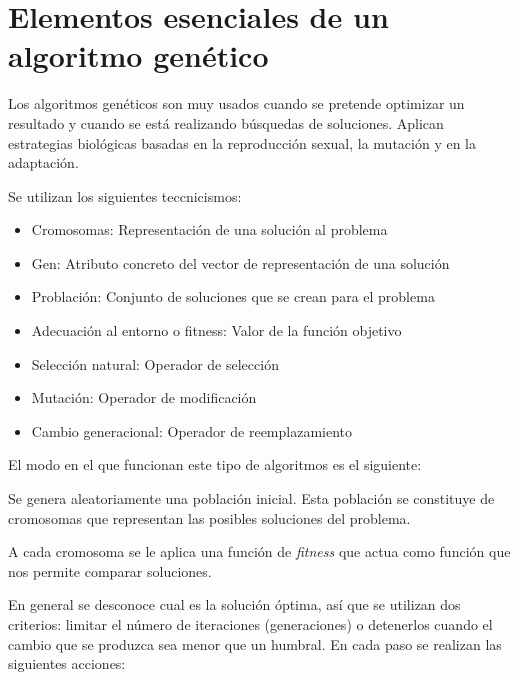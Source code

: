 \documentclass[12pt]{article}
\begin{document}
\section{Elementos esenciales de un algoritmo genético}

Los algoritmos genéticos son muy usados cuando se pretende optimizar
un resultado y cuando se está realizando búsquedas de
soluciones. Aplican estrategias biológicas basadas en la reproducción
sexual, la mutación y en la adaptación.

Se utilizan los siguientes teccnicismos:

\begin{itemize}
\item Cromosomas: Representación de una solución al problema
\item Gen: Atributo concreto del vector de representación de una solución
\item Problación: Conjunto de soluciones que se crean para el problema
\item Adecuación al entorno o fitness: Valor de la función objetivo
\item Selección natural: Operador de selección
\item Mutación: Operador de modificación
\item Cambio generacional: Operador de reemplazamiento
\end{itemize}

El modo en el que funcionan este tipo de algoritmos es el siguiente:

Se genera aleatoriamente una población inicial. Esta población se
constituye de cromosomas que representan las posibles soluciones del
problema.

A cada cromosoma se le aplica una función de \textit{fitness} que
actua como función que nos permite comparar soluciones.

En general se desconoce cual es la solución óptima, así que se
utilizan dos criterios: limitar el número de iteraciones
(generaciones) o detenerlos cuando el cambio que se produzca sea menor
que un humbral. En cada paso se realizan las siguientes acciones:
\end{document}
